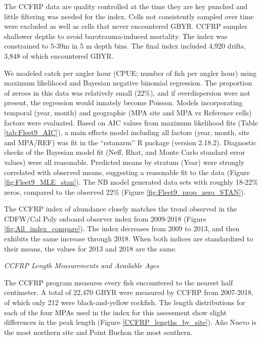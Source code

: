 \documentclass[12pt,]{article}
\begin{document}
The CCFRP data are quality controlled at the time they are key punched
and little filtering was needed for the index. Cells not consistently
sampled over time were excluded as well as cells that never encountered
GBYR. CCFRP samples shallower depths to avoid barotrauma-induced
mortality. The index was constrained to 5-39m in 5 m depth bins. The
final index included 4,920 drifts, 3,848 of which encountered GBYR.

We modeled catch per angler hour (CPUE; number of fish per angler hour)
using maximum likelihood and Bayesian negative binomial regression. The
proportion of zeroes in this data was relatively small (22\%), and if
overdispersion were not present, the regression would innately become
Poisson. Models incorporating temporal (year, month) and geographic (MPA
site and MPA vs Reference cells) factors were evaluated. Based on AIC
values from maximum likelihood fits (Table \ref{tab:Fleet9_AIC}), a main
effects model including all factors (year, month, site and MPA/REF) was
fit in the ``rstanarm'' R package (version 2.18.2). Diagnostic checks of
the Bayesian model fit (Neff, Rhat, and Monte Carlo standard error
values) were all reasonable. Predicted means by stratum (Year) were
strongly correlated with observed means, suggesting a reasonable fit to
the data (Figure \ref{fig:Fleet9_MLE_stan}). The NB model generated data
sets with roughly 18-22\% zeros, compared to the observed 22\% (Figure
\ref{fig:Fleet9_prop_zero_STAN}).

The CCFRP index of abundance closely matches the trend observed in the
CDFW/Cal Poly onboard observer index from 2009-2018 (Figure
\ref{fig:All_index_compare}). The index decreases from 2009 to 2013, and
then exhibits the same increase through 2018. When both indices are
standardized to their means, the values for 2013 and 2018 are the same.

\emph{CCFRP Length Measurements and Available Ages}

The CCFRP program measures every fish encountered to the nearest half
centimeter. A total of 22,470 GBYR were measured by CCFRP from
2007-2018, of which only 212 were black-and-yellow rockfish. The length
distributions for each of the four MPAs used in the index for this
assessment show slight differences in the peak length (Figure
\ref{CCFRP_lengths_by_site}). Año Nuevo is the most northern site and
Point Buchon the most southern.
\end{document}
